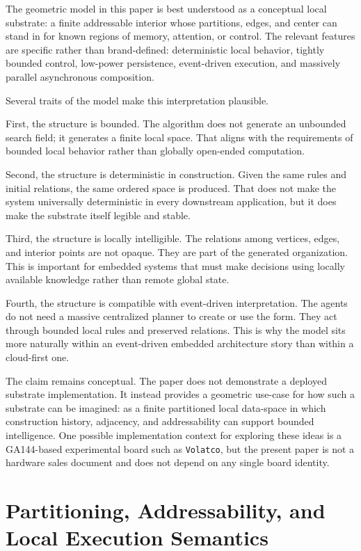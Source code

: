 \documentclass[11pt]{article}
\begin{document}
The geometric model in this paper is best understood as a conceptual local
substrate: a finite addressable interior whose partitions, edges, and center
can stand in for known regions of memory, attention, or control. The relevant
features are specific rather than brand-defined: deterministic local behavior,
tightly bounded control, low-power persistence, event-driven execution, and
massively parallel asynchronous composition.

Several traits of the model make this interpretation plausible.

First, the structure is bounded. The algorithm does not generate an unbounded
search field; it generates a finite local space. That aligns with the
requirements of bounded local behavior rather than globally open-ended
computation.

Second, the structure is deterministic in construction. Given the same rules
and initial relations, the same ordered space is produced. That does not make
the system universally deterministic in every downstream application, but it
does make the substrate itself legible and stable.

Third, the structure is locally intelligible. The relations among vertices,
edges, and interior points are not opaque. They are part of the generated
organization. This is important for embedded systems that must make decisions
using locally available knowledge rather than remote global state.

Fourth, the structure is compatible with event-driven interpretation. The
agents do not need a massive centralized planner to create or use the form.
They act through bounded local rules and preserved relations. This is why the
model sits more naturally within an event-driven embedded architecture story
than within a cloud-first one.

The claim remains conceptual. The paper does not demonstrate a deployed
substrate implementation. It instead provides a geometric use-case for how such
a substrate can be imagined: as a finite partitioned local data-space in which
construction history, adjacency, and addressability can support bounded
intelligence. One possible implementation context for exploring these ideas is
a GA144-based experimental board such as \texttt{Volatco}, but the present
paper is not a hardware sales document and does not depend on any single board
identity.

\section{Partitioning, Addressability, and Local Execution Semantics}
\end{document}
